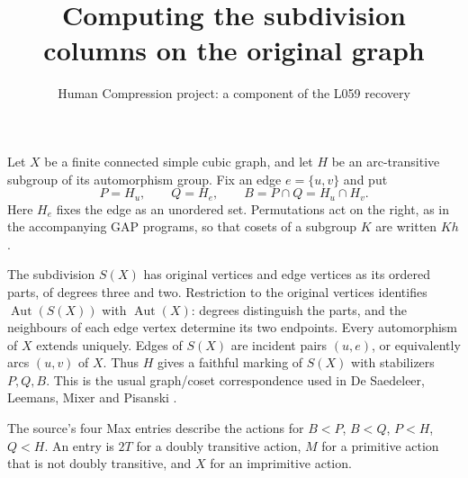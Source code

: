 \documentclass[11pt,a4paper]{article}
\title{Computing the subdivision columns on the original graph}
\author{Human Compression project: a component of the L059 recovery}
\date{}
\begin{document}
\maketitle

Let $X$ be a finite connected simple cubic graph, and let $H$ be
an arc-transitive subgroup of its automorphism group. Fix an edge
$e=\{u,v\}$ and put
\[
 P=H_u,\qquad Q=H_e,\qquad B=P\cap Q=H_u\cap H_v.
\]
Here $H_e$ fixes the edge as an unordered set. Permutations act on
the right, as in the accompanying GAP programs, so that cosets of
a subgroup $K$ are written $Kh$.

The subdivision $S(X)$ has original vertices and edge vertices
as its ordered parts, of degrees three and two. Restriction to
the original vertices identifies $\operatorname{Aut}(S(X))$ with
$\operatorname{Aut}(X)$: degrees distinguish the parts, and the
neighbours of each edge vertex determine its two endpoints.
Every automorphism of $X$ extends uniquely. Edges of $S(X)$ are
incident pairs $(u,e)$, or equivalently arcs $(u,v)$ of $X$.
Thus $H$ gives a faithful marking of $S(X)$ with stabilizers
$P,Q,B$. This is the usual graph/coset correspondence used in
De Saedeleer, Leemans, Mixer and Pisanski \cite{source}.

The source's four Max entries describe the actions for
$B<P$, $B<Q$, $P<H$, $Q<H$. An entry is $2T$ for a doubly
transitive action, $M$ for a primitive action that is not doubly
transitive, and $X$ for an imprimitive action.
\end{document}
